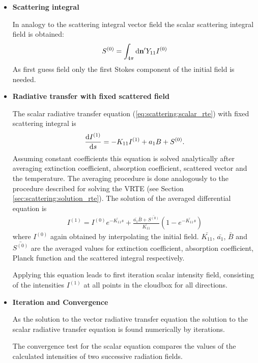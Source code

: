 \label{sec:scattering:solution_rte_scalar}
\begin{itemize}
\item {\bf Scattering integral}
  
  In analogy to the scattering integral vector field the scalar
  scattering integral field is obtained:
\begin{eqnarray}
  S^{(0)}  = \int_{4\pi} \mathrm{d} {\bf n}^\prime Y_{11} I^{(0)} 
\end{eqnarray}
As first guess field only the first Stokes component of the initial
field is needed.

\item{\bf Radiative transfer with fixed scattered field}
  
  The scalar radiative transfer equation
  (\ref{eq:scattering:scalar_rte}) with fixed scattering integral is
\begin{eqnarray}
  \label{eq:scattering:scalar_rte_scatint}
\frac{\mathrm{d} I^{(1)}}{\mathrm{d} s} = -K_{11} I^{(1)}
 + a_1 B + S^{(0)}.
\end{eqnarray} 
Assuming constant coefficients this equation is solved analytically
after averaging extinction coefficient, absorption coefficient,
scattered vector and the temperature. The averaging procedure is done
analogously to the procedure described for solving the VRTE (see
Section \ref{sec:scattering:solution_rte}).  The solution of the
averaged differential equation is
\begin{eqnarray}
   \label{eq:scattering:scalar_rte_sol}
I^{(1)} = I^{(0)} e^{-\bar{K_{11}}s} + \frac{\bar{a_1}
  \bar{B} + \bar{S^{(0)}}}{\bar{K_{11}}}\left(1-e^{-\bar{K_{11}}s}\right)
\end{eqnarray}
where $I^{(0)}$ again obtained by interpolating the initial field.
$\bar{K_{11}}$, $\bar{a_1}$, $\bar{B}$ and $\bar{S^{(0)}}$ are the
averaged values for extinction coefficient, absorption coefficient,
Planck function and the scattered integral respectively.

Applying this equation leads to first iteration scalar intensity
field, consisting of the intensities $I^{(1)}$ at all points in the
cloudbox for all directions.

\item{\bf Iteration and Convergence}
  
  As the solution to the vector radiative transfer equation the
  solution to the scalar radiative transfer equation is found
  numerically by iterations.
  
  The convergence test for the scalar equation compares the values of
  the calculated intensities of two successive radiation fields.

\end{itemize}



